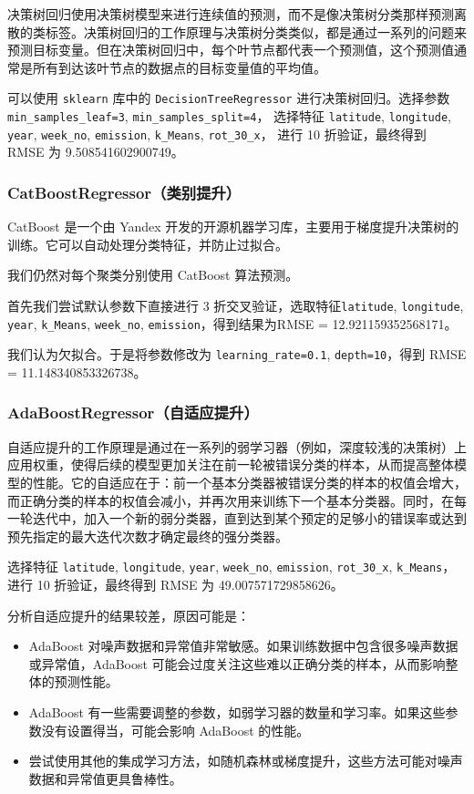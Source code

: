 \documentclass{ctexart}
\begin{document}
\begin{sloppypar}
决策树回归使用决策树模型来进行连续值的预测，而不是像决策树分类那样预测离散的类标签。决策树回归的工作原理与决策树分类类似，都是通过一系列的问题来预测目标变量。但在决策树回归中，每个叶节点都代表一个预测值，这个预测值通常是所有到达该叶节点的数据点的目标变量值的平均值。

可以使用 \texttt{sklearn} 库中的 \texttt{DecisionTreeRegressor} 进行决策树回归。选择参数
\texttt{min\_samples\_leaf=3}, \texttt{min\_samples\_split=4}，
选择特征 \texttt{latitude}, \texttt{longitude}, \texttt{year}, \texttt{week\_no}, \texttt{emission}, \texttt{k\_Means}, \texttt{rot\_30\_x}，
进行 10 折验证，最终得到 RMSE 为 9.508541602900749。

\subsubsection{CatBoostRegressor（类别提升）}

CatBoost 是一个由 Yandex 开发的开源机器学习库，主要用于梯度提升决策树的训练。它可以自动处理分类特征，并防止过拟合。

我们仍然对每个聚类分别使用 CatBoost 算法预测。

首先我们尝试默认参数下直接进行 3 折交叉验证，选取特征\texttt{latitude}, \texttt{longitude}, \texttt{year}, \texttt{k\_Means}, \texttt{week\_no}, \texttt{emission}，得到结果为RMSE = 12.921159352568171。

我们认为欠拟合。于是将参数修改为 \texttt{learning\_rate=0.1}, \texttt{depth=10}，得到 RMSE = 11.148340853326738。

\subsubsection{AdaBoostRegressor（自适应提升）}

自适应提升的工作原理是通过在一系列的弱学习器（例如，深度较浅的决策树）上应用权重，使得后续的模型更加关注在前一轮被错误分类的样本，从而提高整体模型的性能。它的自适应在于：前一个基本分类器被错误分类的样本的权值会增大，而正确分类的样本的权值会减小，并再次用来训练下一个基本分类器。同时，在每一轮迭代中，加入一个新的弱分类器，直到达到某个预定的足够小的错误率或达到预先指定的最大迭代次数才确定最终的强分类器。

选择特征 \texttt{latitude}, \texttt{longitude}, \texttt{year}, \texttt{week\_no}, \texttt{emission}, \texttt{rot\_30\_x}, \texttt{k\_Means}，进行 10 折验证，最终得到 RMSE 为 49.007571729858626。

分析自适应提升的结果较差，原因可能是：

\begin{itemize}
      \item AdaBoost 对噪声数据和异常值非常敏感。如果训练数据中包含很多噪声数据或异常值，AdaBoost 可能会过度关注这些难以正确分类的样本，从而影响整体的预测性能。
      \item AdaBoost 有一些需要调整的参数，如弱学习器的数量和学习率。如果这些参数没有设置得当，可能会影响 AdaBoost 的性能。
      \item 尝试使用其他的集成学习方法，如随机森林或梯度提升，这些方法可能对噪声数据和异常值更具鲁棒性。
\end{itemize}


\end{sloppypar}
\end{document}
